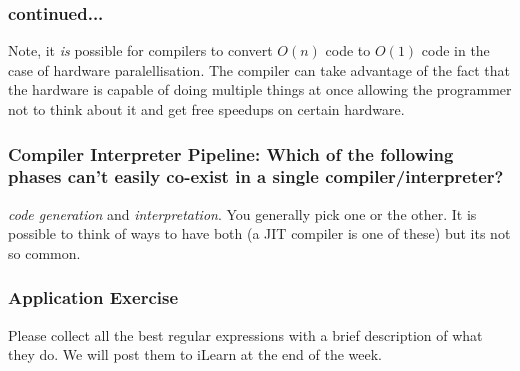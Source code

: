 \documentclass[11pt]{beamer}
\begin{document}
\begin{frame}
    \frametitle{continued...}
Note, it \emph{is} possible for compilers to convert $O(n)$ code to $O(1)$ code in the case of hardware paralellisation.  The compiler can take advantage of the fact that the hardware is capable of doing multiple things at once allowing the programmer not to think about it and get free speedups on certain hardware.
    
\end{frame}

\begin{frame}
\frametitle{Compiler Interpreter Pipeline: Which of the following phases can't easily co-exist in a single compiler/interpreter?}
\emph{code generation} and \emph{interpretation}.  You generally pick one or the other.  It is possible to think of ways to have both (a JIT compiler is one of these) but its not so common.
\end{frame}

\begin{frame}
\frametitle{Application Exercise}
Please collect all the best regular expressions with a brief description of what they do.  We will post them to iLearn at the end of the week.
\end{frame}
\end{document}
